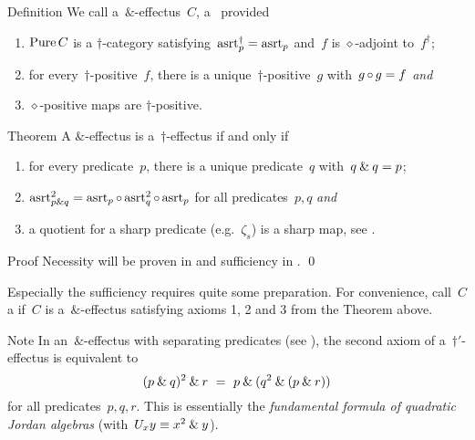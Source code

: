 \documentclass[b]{subfiles}
\begin{document}
\begin{parsec}%
\begin{point}{Definition}%
We call a~$\&$-effectus~$C$,
    a~ provided
\begin{enumerate}
\item
    $\operatorname{Pure} C$ is a  $\dagger$-category
     satisfying~$\mathrm{asrt}_p^\dagger = \mathrm{asrt}_p$
        and~$f$ is $\diamond$-adjoint to~$f^\dagger$;
\item
    for every~$\dagger$-positive~$f$,
        there is a unique~$\dagger$-positive~$g$
        with~$g \mathop{\circ} g = f$ \emph{and}
\item
    $\diamond$-positive maps are $\dagger$-positive.
\end{enumerate}
\end{point}
\begin{point}{Theorem}%
    A $\&$-effectus
        is a~$\dagger$-effectus if and only if
\begin{enumerate}
\item
for every predicate~$p$, there is a unique predicate~$q$
    with~$q \mathbin{\&} q = p$;
\item
    $\mathrm{asrt}^2_{p \mathbin{\&} q}
        = \mathrm{asrt}_p \mathop{\circ} \mathrm{asrt}^2_q \mathop{\circ} \mathrm{asrt}_p$
     for all predicates~$p,q$ \emph{and}
\item
    a quotient for a sharp predicate (e.g.~$\zeta_s$)
    is a sharp map, see .
\end{enumerate}
\begin{point}{Proof}%
Necessity will be proven in
        and sufficiency in . \qed
\end{point}
\begin{point}%
Especially the sufficiency requires quite some preparation.
For convenience, call~$C$ a 
    if~$C$ is a~$\&$-effectus
    satisfying axioms 1, 2 and 3 from the Theorem above.
\end{point}
\begin{point}{Note}%
    In an~$\&$-effectus
    with separating predicates
    (see ),
    the second axiom of a~$\dagger'$-effectus is equivalent
    to
\begin{equation*}
    (p \mathbin{\&} q)^2 \mathbin{\&} r
    \ =\  p \mathbin{\&} (q^2 \mathbin{\&} (p \mathbin{\&} r))
\end{equation*}
    for all predicates~$p,q,r$.
This is essentially the \emph{fundamental formula
    of quadratic Jordan algebras} \cite[\S 4.2]{mccrimmon2006taste}
    (with~$U_x y \equiv x^2 \mathbin{\&} y$).
\end{point}
\end{point}
\end{parsec}
\end{document}
